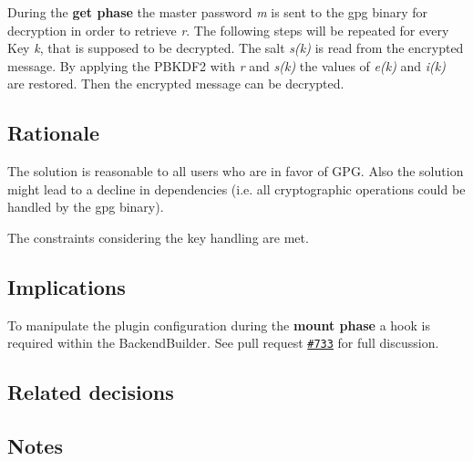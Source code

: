 During the {\bfseries get phase} the master password {\itshape m} is sent to the gpg binary for decryption in order to retrieve {\itshape r}. The following steps will be repeated for every Key {\itshape k}, that is supposed to be decrypted. The salt {\itshape s(k)} is read from the encrypted message. By applying the P\+B\+K\+D\+F2 with {\itshape r} and {\itshape s(k)} the values of {\itshape e(k)} and {\itshape i(k)} are restored. Then the encrypted message can be decrypted.

\subsection*{Rationale}

The solution is reasonable to all users who are in favor of G\+PG. Also the solution might lead to a decline in dependencies (i.\+e. all cryptographic operations could be handled by the gpg binary).

The constraints considering the key handling are met.

\subsection*{Implications}

To manipulate the plugin configuration during the {\bfseries mount phase} a hook is required within the {\ttfamily Backend\+Builder}. See pull request \href{https://github.com/ElektraInitiative/libelektra/pull/733}{\tt \#733} for full discussion.

\subsection*{Related decisions}

\subsection*{Notes}